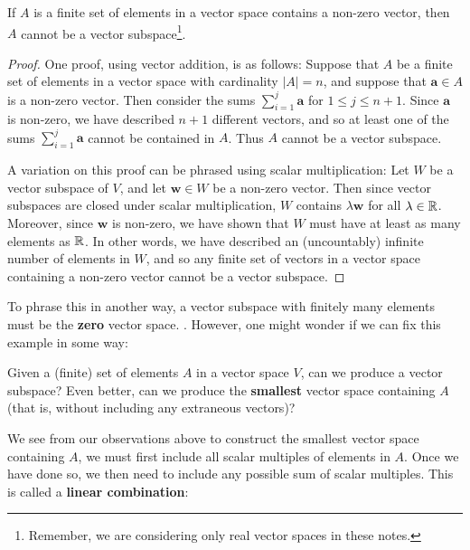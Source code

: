     \begin{example}
    \vspace{-1em}
    \begin{proposition}
    If $A$ is a finite set of elements in a vector space contains a non-zero vector, then $A$ cannot be a vector subspace\footnote{Remember, we are considering only real vector spaces in these notes.}.  
    \end{proposition}
    \end{example}
    
    \begin{proof}
    One proof, using vector addition, is as follows:  Suppose that $A$ be a finite set of elements in a vector space with cardinality $|A|=n$, and suppose that $\bm{a} \in A$ is a non-zero vector.  Then consider the sums $\sum_{i=1}^j\bm{a}$ for $1 \leq j \leq n+1$.  Since $\bm{a}$ is non-zero, we have described $n+1$ different vectors, and so at least one of the sums $\sum_{i=1}^j\bm{a}$ cannot be contained in $A$.  Thus $A$ cannot be a vector subspace.  
    
    A variation on this proof can be phrased using scalar multiplication: Let $W$ be a vector subspace of $V$, and let $\bm{w} \in W$ be a non-zero vector.  Then since vector subspaces are closed under scalar multiplication, $W$ contains $\lambda \bm{w}$ for all $\lambda \in \mathbb{R}$.  Moreover, since $\bm{w}$ is non-zero, we have shown that $W$ must have at least as many elements as $\mathbb{R}$.  In other words, we have described an (uncountably) infinite number of elements in $W$, and so any finite set of vectors in a vector space containing a non-zero vector cannot be a vector subspace.
        
    \end{proof}
    

    To phrase this in another way, a vector subspace with finitely many elements must be the \textbf{zero} vector space. .  However, one might wonder if we can fix this example in some way:

    \begin{motivating}
      Given a (finite) set of elements $A$ in a vector space $V$, can we produce a vector subspace?  Even better, can we produce the \textbf{smallest} vector space containing $A$ (that is, without including any extraneous vectors)?
    \end{motivating}
    
    We see from our observations above to construct the smallest vector space containing $A$, we must first include all scalar multiples of elements in $A$.  Once we have done so, we then need to include any possible sum of scalar multiples.  This is called a \textbf{linear combination}:
    
